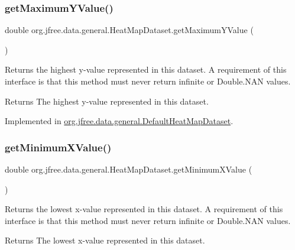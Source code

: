 \subsubsection{\texorpdfstring{get\+Maximum\+Y\+Value()}{getMaximumYValue()}}
{\footnotesize\ttfamily double org.\+jfree.\+data.\+general.\+Heat\+Map\+Dataset.\+get\+Maximum\+Y\+Value (\begin{DoxyParamCaption}{ }\end{DoxyParamCaption})}

Returns the highest y-\/value represented in this dataset. A requirement of this interface is that this method must never return infinite or Double.\+N\+AN values.

\begin{DoxyReturn}{Returns}
The highest y-\/value represented in this dataset. 
\end{DoxyReturn}


Implemented in \mbox{\hyperlink{classorg_1_1jfree_1_1data_1_1general_1_1_default_heat_map_dataset_a5d18e184f6950c93da573d964e692d5c}{org.\+jfree.\+data.\+general.\+Default\+Heat\+Map\+Dataset}}.

\mbox{\label{interfaceorg_1_1jfree_1_1data_1_1general_1_1_heat_map_dataset_aa2c36fac599d77d64ea85f069eba243c}} 
\subsubsection{\texorpdfstring{get\+Minimum\+X\+Value()}{getMinimumXValue()}}
{\footnotesize\ttfamily double org.\+jfree.\+data.\+general.\+Heat\+Map\+Dataset.\+get\+Minimum\+X\+Value (\begin{DoxyParamCaption}{ }\end{DoxyParamCaption})}

Returns the lowest x-\/value represented in this dataset. A requirement of this interface is that this method must never return infinite or Double.\+N\+AN values.

\begin{DoxyReturn}{Returns}
The lowest x-\/value represented in this dataset. 
\end{DoxyReturn}



